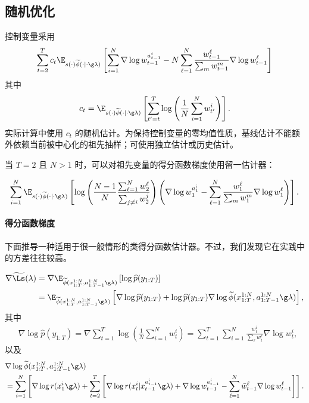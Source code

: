 \subsection{随机优化}\label{sec:supp:so}

控制变量采用
\begin{align*}
\sum_{t=2}^T c_t \E_{s(\cdot)\widetilde\phi(\cdot\mid\cdot\g\lambda)}
\left[\sum_{i=1}^N \nabla \log w_{t-1}^{a_{t-1}^i} - 
N\sum_{\ell=1}^N \frac{w_{t-1}^\ell}{\sum_m w_{t-1}^m} \nabla \log 
w_{t-1}^\ell \right]
\end{align*}
其中
\begin{align*}
c_t = \E_{s(\cdot)\widetilde\phi(\cdot\mid\cdot\g\lambda)}
\left[  \sum_{t'=t}^T 
\log\left(\frac{1}{N}\sum_{i=1}^N 
w_{t'}^i\right) \right].
\end{align*}
实际计算中使用 $c_t$ 的随机估计。为保持控制变量的零均值性质，基线估计不能额外依赖当前被中心化的祖先抽样；可使用独立估计或历史估计。

当 $T=2$ 且 $N>1$ 时，可以对祖先变量的得分函数梯度使用留一估计器：

\begin{align*}
\sum_{i=1}^N \E_{s(\cdot)\widetilde\phi(\cdot\mid\cdot\g\lambda)}
\left[\log \left(\frac{N-1}{N}\frac{\sum_{\ell=1}^N w_2^\ell}{\sum_{j\neq i}w_2^j}\right) \left(\nabla \log w_{1}^{a_{1}^i} - 
\sum_{\ell=1}^N \frac{w_{1}^\ell}{\sum_m w_{1}^m} \nabla \log 
w_{1}^\ell \right)\right].
\end{align*}

\paragraph{得分函数梯度}\label{sec:scfnc}
下面推导一种适用于很一般情形的类得分函数估计器。不过，我们发现它在实践中的方差往往较高。

\begin{align*}
\nabla \widetilde\Ls(\lambda) &= \nabla 
\E_{\widetilde\phi(x_{1:T}^{1:N},a_{1:T-1}^{1:N}\g\lambda)}\left[\log 
\widehat{p}(y_{1:T})\right] \\
&= \E_{\widetilde\phi(x_{1:T}^{1:N},a_{1:T-1}^{1:N}\g\lambda)}\left[
\nabla \log \widehat{p}(y_{1:T}) + 
\log \widehat{p}(y_{1:T}) \nabla \log \widetilde\phi(x_{1:T}^{1:N},a_{1:T-1}^{1:N}\g\lambda)
\right],
\end{align*}
其中
\begin{align*}
&\nabla \log \widehat{p}(y_{1:T}) = \nabla \sum_{t=1}^T  
\log\left(\frac{1}{N}\sum_{i=1}^N w_t^i\right) = \sum_{t=1}^T\sum_{i=1}^N 
\frac{w_t^i}{\sum_\ell w_t^\ell}\nabla \log w_t^i,
\end{align*}
以及
\begin{align*}
&\nabla \log \widetilde\phi(x_{1:T}^{1:N},a_{1:T-1}^{1:N}\g\lambda) \\ 
&= 
\sum_{i=1}^N \left[\nabla \log r(x_1^i\g\lambda) + \sum_{t=2}^T \left[\nabla \log
r(x_t^i|x_{t-1}^{a_{t-1}^i}\g\lambda) + \nabla \log w_{t-1}^{a_{t-1}^i} - 
\sum_{\ell=1}^N \bar w_{t-1}^\ell \nabla \log w_{t-1}^\ell \right] \right].
\end{align*}

